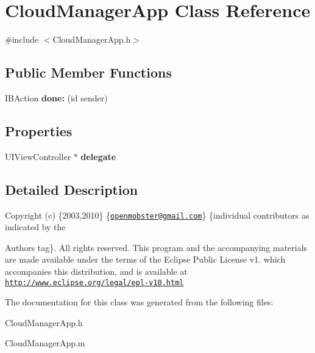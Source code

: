 \hypertarget{interface_cloud_manager_app}{
\section{\-Cloud\-Manager\-App \-Class \-Reference}
\label{interface_cloud_manager_app}
}


{\ttfamily \#include $<$\-Cloud\-Manager\-App.\-h$>$}

\subsection*{\-Public \-Member \-Functions}
\begin{DoxyCompactItemize}
\item 
\hypertarget{interface_cloud_manager_app_a19091dc32e0e237f95f886aa3a2a14a8}{
\-I\-B\-Action {\bfseries done\-:} (id sender)}
\label{interface_cloud_manager_app_a19091dc32e0e237f95f886aa3a2a14a8}

\end{DoxyCompactItemize}
\subsection*{\-Properties}
\begin{DoxyCompactItemize}
\item 
\hypertarget{interface_cloud_manager_app_aece0ab678730dbb0330a4db54b9b0a02}{
\-U\-I\-View\-Controller $\ast$ {\bfseries delegate}}
\label{interface_cloud_manager_app_aece0ab678730dbb0330a4db54b9b0a02}

\end{DoxyCompactItemize}


\subsection{\-Detailed \-Description}
\-Copyright (c) \{2003,2010\} \{\href{mailto:openmobster@gmail.com}{\tt openmobster@gmail.\-com}\} \{individual contributors as indicated by the \begin{DoxyAuthor}{\-Authors}
tag\}. \-All rights reserved. \-This program and the accompanying materials are made available under the terms of the \-Eclipse \-Public \-License v1. which accompanies this distribution, and is available at \href{http://www.eclipse.org/legal/epl-v10.html}{\tt http\-://www.\-eclipse.\-org/legal/epl-\/v10.\-html} 
\end{DoxyAuthor}


\-The documentation for this class was generated from the following files\-:\begin{DoxyCompactItemize}
\item 
\-Cloud\-Manager\-App.\-h\item 
\-Cloud\-Manager\-App.\-m\end{DoxyCompactItemize}
